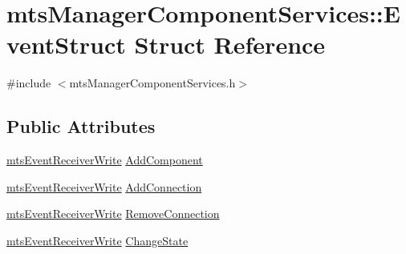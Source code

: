 \hypertarget{structmts_manager_component_services_1_1_event_struct}{\section{mts\-Manager\-Component\-Services\-:\-:Event\-Struct Struct Reference}
\label{structmts_manager_component_services_1_1_event_struct}
}


{\ttfamily \#include $<$mts\-Manager\-Component\-Services.\-h$>$}

\subsection*{Public Attributes}
\begin{DoxyCompactItemize}
\item 
\hyperlink{classmts_event_receiver_write}{mts\-Event\-Receiver\-Write} \hyperlink{structmts_manager_component_services_1_1_event_struct_a5eb66fcf09966335bea86277857a9ae8}{Add\-Component}
\item 
\hyperlink{classmts_event_receiver_write}{mts\-Event\-Receiver\-Write} \hyperlink{structmts_manager_component_services_1_1_event_struct_a6e99e7d1807c8eb2dfcc7ffe670d7ddb}{Add\-Connection}
\item 
\hyperlink{classmts_event_receiver_write}{mts\-Event\-Receiver\-Write} \hyperlink{structmts_manager_component_services_1_1_event_struct_ac10cc608ffc0312aaeb4c3860e1c24c2}{Remove\-Connection}
\item 
\hyperlink{classmts_event_receiver_write}{mts\-Event\-Receiver\-Write} \hyperlink{structmts_manager_component_services_1_1_event_struct_a9b69075f40fdc89a7df1d635ce388946}{Change\-State}
\end{DoxyCompactItemize}


